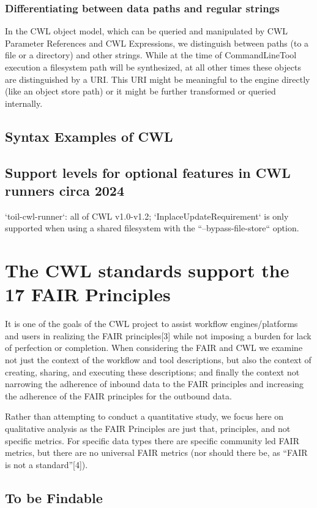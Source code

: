\subsubsection{Differentiating between data paths and regular strings}
In the CWL object model, which can be queried and manipulated by CWL Parameter References and CWL Expressions, we distinguish between paths (to a file or a directory) and other strings.
While at the time of CommandLineTool execution a filesystem path will be synthesized, at all other times these objects are distinguished by a URI.
This URI might be meaningful to the engine directly (like an object store path) or it might be further transformed or queried internally.

\subsection{Syntax Examples of CWL}

\subsection{Support levels for optional features in CWL runners circa 2024}
`toil-cwl-runner`: all of CWL v1.0-v1.2; `InplaceUpdateRequirement` is only supported when using a shared filesystem with the ``--bypass-file-store`` option.


\section{The CWL standards support the 17 FAIR Principles}
It is one of the goals of the CWL project to assist workflow engines/platforms and users in realizing the FAIR principles[3] while not imposing a burden for lack of perfection or completion. When considering the FAIR and CWL we examine not just the context of the workflow and tool descriptions, but also the context of creating, sharing, and executing these descriptions; and finally the context not narrowing the adherence of inbound data to the FAIR principles and increasing the adherence of the FAIR principles for the outbound data.

Rather than attempting to conduct a quantitative study, we focus here on qualitative analysis as the FAIR Principles are just that, principles, and not specific metrics. For specific data types there are specific community led FAIR metrics, but there are no universal FAIR metrics (nor should there be, as “FAIR is not a standard”[4]).
\subsection{To be Findable}
